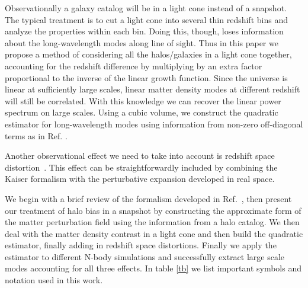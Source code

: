 \documentclass[prd,amsmath,amssymb,floatfix,superscriptaddress,nofootinbib,twocolumn]{revtex4-1}
\begin{document}
Observationally a galaxy catalog will be in a light cone \cite{Carroll:1997gr} instead of a snapshot. The typical  treatment is to cut a light cone into several thin redshift bins \cite{Chuang:2016uuz} and analyze the properties within each bin. Doing this, though, loses information about the long-wavelength modes along line of sight. Thus in this paper we propose a method of considering all the halos/galaxies in a light cone together, accounting for the redshift difference by multiplying by an extra factor proportional to the inverse of the linear growth function. Since the universe is linear at sufficiently large scales, linear matter density modes at different redshift will still be correlated. With this knowledge we can recover the linear power spectrum on large scales. Using a cubic volume, we construct the quadratic estimator for long-wavelength modes using information from non-zero off-diagonal terms as in Ref. \cite{Li:2020fir}.

Another observational effect we need to take into account is redshift space distortion~\cite{Kaiser:1987rsd}. This effect can be straightforwardly included by combining the Kaiser formalism with the perturbative expansion developed in real space.

We begin with a brief review of the formalism developed in Ref.~\cite{Li:2020fir}, then present our treatment of halo bias in a snapshot by constructing the approximate form of the matter perturbation field using the information from a halo catalog. We then deal with the matter density contrast in a light cone and then build the quadratic estimator, finally adding in redshift space distortions. Finally we apply the estimator to different N-body simulations and successfully extract large scale modes accounting for all three effects. In table \ref{tb} we list important symbols and notation used in this work.
\clearpage
\end{document}
